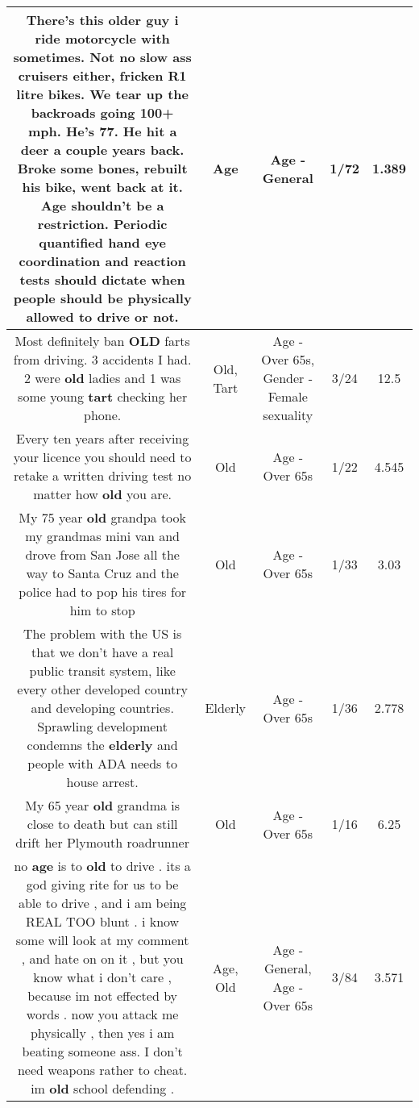 \documentclass[11pt]{article}
\newlength\mylength
\begin{document}
\begin{center}
\begin{longtable}{|C{.65\mylength}|C{.30\mylength}|C{.12\mylength}|C{.12\mylength}|C{.12\mylength}|}
  \small There's this older guy i ride motorcycle with sometimes. Not no slow ass cruisers either, fricken R1 litre bikes. We tear up the backroads going 100+ mph. He's 77. He hit a deer a couple years back. Broke some bones, rebuilt his bike, went back at it. \textbf{Age} shouldn't be a restriction. Periodic quantified hand eye coordination and reaction tests should dictate when people should be physically allowed to drive or not.\normalsize   & Age & Age - General & 1/72 & 1.389 \\  \hline
  \small Most definitely ban \textbf{OLD} farts from driving.  3 accidents I had.  2 were \textbf{old} ladies and 1 was some young \textbf{tart} checking her phone.\normalsize   & Old, Tart & Age - Over 65s, Gender - Female sexuality & 3/24 & 12.5 \\  \hline
  \small Every ten years after receiving your licence you should need to retake a written driving test no matter how \textbf{old} you are.\normalsize   & Old & Age - Over 65s & 1/22 & 4.545 \\  \hline
  \small My 75 year \textbf{old} grandpa took my grandmas mini van and drove from San Jose all the way to Santa Cruz and the police had to pop his tires for him to stop\normalsize   & Old & Age - Over 65s & 1/33 & 3.03 \\  \hline
  \small The problem with the US is that we don't have a real public transit system, like every other developed country and developing countries. Sprawling development condemns the \textbf{elderly} and people with ADA needs to house arrest.\normalsize   & Elderly & Age - Over 65s & 1/36 & 2.778 \\  \hline
  \small My 65 year \textbf{old} grandma is close to  death but can still drift her Plymouth roadrunner\normalsize   & Old & Age - Over 65s & 1/16 & 6.25 \\  \hline
  \small no \textbf{age} is to \textbf{old} to drive . its a god giving rite for us to be able to drive , and i am being REAL TOO blunt . i know some will look at my comment , and hate on on it , but you know what i don't care , because im not effected by words . now you attack me physically , then yes i am beating someone ass. I don't need weapons rather to cheat. im \textbf{old} school defending .\normalsize   & Age, Old & Age - General, Age - Over 65s & 3/84 & 3.571 \\  \hline

\end{longtable}
\end{center}
\end{document}

